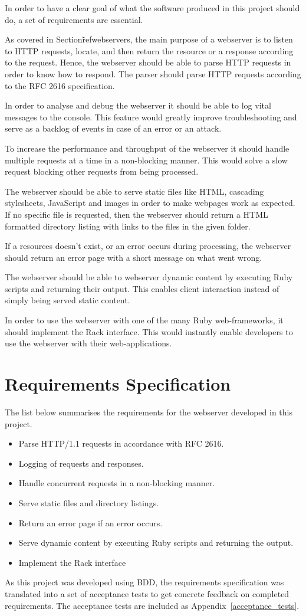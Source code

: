 In order to have a clear goal of what the software produced in this project
should do, a set of requirements are essential. 

As covered in Section\~ref{webservers}, the main purpose of a webserver is to
listen to HTTP requests, locate, and then return the resource or a response
according to the request. Hence, the webserver should be able to parse HTTP
requests in order to know how to respond. The parser should parse HTTP
requests according to the RFC 2616 specification.

In order to analyse and debug the webserver it should be able to log vital
messages to the console. This feature would greatly improve troubleshooting
and serve as a backlog of events in case of an error or an attack.

To increase the performance and throughput of the webserver it should handle
multiple requests at a time in a non-blocking manner. This would solve a slow
request blocking other requests from being processed.

The webserver should be able to serve static files like HTML, cascading
stylesheets, JavaScript and images in order to make webpages work as expected.
If no specific file is requested, then the webserver should return a HTML
formatted directory listing with links to the files in the given folder.

If a resources doesn't exist, or an error occurs during processing, the
webserver should return an error page with a short message on what went wrong.

The webserver should be able to webserver dynamic content by executing Ruby
scripts and returning their output. This enables client interaction instead of
simply being served static content.

In order to use the webserver with one of the many Ruby web-frameworks, it
should implement the Rack interface. This would instantly enable developers to
use the webserver with their web-applications.

\section{Requirements Specification}
The list below summarises the requirements for the webserver developed in this
project.

\begin{itemize}
  \item Parse HTTP/1.1 requests in accordance with RFC 2616.
  \item Logging of requests and responses.
  \item Handle concurrent requests in a non-blocking manner.
  \item Serve static files and directory listings.
  \item Return an error page if an error occurs.
  \item Serve dynamic content by executing Ruby scripts and returning the
  output.
  \item Implement the Rack interface
\end{itemize}

As this project was developed using BDD, the requirements specification was
translated into a set of acceptance tests to get concrete feedback on
completed requirements. The acceptance tests are included as
Appendix~\ref{acceptance_tests}.
